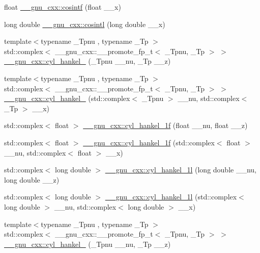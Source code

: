 \begin{DoxyCompactItemize}
\item 
float \hyperlink{group__gnu__math__spec__func_ga87202351dc97d2c69e42bf58f911fb5a}{\+\_\+\+\_\+gnu\+\_\+cxx\+::cosintf} (float \+\_\+\+\_\+x)
\item 
long double \hyperlink{group__gnu__math__spec__func_ga5f01f17ae8859129860118b09d51791c}{\+\_\+\+\_\+gnu\+\_\+cxx\+::cosintl} (long double \+\_\+\+\_\+x)
\item 
{\footnotesize template$<$typename \+\_\+\+Tpnu , typename \+\_\+\+Tp $>$ }\\std\+::complex$<$ \+\_\+\+\_\+gnu\+\_\+cxx\+::\+\_\+\+\_\+promote\+\_\+fp\+\_\+t$<$ \+\_\+\+Tpnu, \+\_\+\+Tp $>$ $>$ \hyperlink{group__gnu__math__spec__func_gafa5ad1cfd4cc30caaeb06bdab71e600b}{\+\_\+\+\_\+gnu\+\_\+cxx\+::cyl\+\_\+hankel\+\_} (\+\_\+\+Tpnu \+\_\+\+\_\+nu, \+\_\+\+Tp \+\_\+\+\_\+z)
\item 
{\footnotesize template$<$typename \+\_\+\+Tpnu , typename \+\_\+\+Tp $>$ }\\std\+::complex$<$ \+\_\+\+\_\+gnu\+\_\+cxx\+::\+\_\+\+\_\+promote\+\_\+fp\+\_\+t$<$ \+\_\+\+Tpnu, \+\_\+\+Tp $>$ $>$ \hyperlink{group__gnu__math__spec__func_ga0f0b05c483ed1d713ef9a96e844c1979}{\+\_\+\+\_\+gnu\+\_\+cxx\+::cyl\+\_\+hankel\+\_} (std\+::complex$<$ \+\_\+\+Tpnu $>$ \+\_\+\+\_\+nu, std\+::complex$<$ \+\_\+\+Tp $>$ \+\_\+\+\_\+x)
\item 
std\+::complex$<$ float $>$ \hyperlink{group__gnu__math__spec__func_ga89758ed03e56567baa62b90cc4784f71}{\+\_\+\+\_\+gnu\+\_\+cxx\+::cyl\+\_\+hankel\+\_\+1f} (float \+\_\+\+\_\+nu, float \+\_\+\+\_\+z)
\item 
std\+::complex$<$ float $>$ \hyperlink{group__gnu__math__spec__func_ga810e021a3f11c1b2253c15c6f4d41143}{\+\_\+\+\_\+gnu\+\_\+cxx\+::cyl\+\_\+hankel\+\_\+1f} (std\+::complex$<$ float $>$ \+\_\+\+\_\+nu, std\+::complex$<$ float $>$ \+\_\+\+\_\+x)
\item 
std\+::complex$<$ long double $>$ \hyperlink{group__gnu__math__spec__func_gacb49c66b4267fbc56906db02f14365f2}{\+\_\+\+\_\+gnu\+\_\+cxx\+::cyl\+\_\+hankel\+\_\+1l} (long double \+\_\+\+\_\+nu, long double \+\_\+\+\_\+z)
\item 
std\+::complex$<$ long double $>$ \hyperlink{group__gnu__math__spec__func_ga6900f79ec70673bcb001538aec74e07c}{\+\_\+\+\_\+gnu\+\_\+cxx\+::cyl\+\_\+hankel\+\_\+1l} (std\+::complex$<$ long double $>$ \+\_\+\+\_\+nu, std\+::complex$<$ long double $>$ \+\_\+\+\_\+x)
\item 
{\footnotesize template$<$typename \+\_\+\+Tpnu , typename \+\_\+\+Tp $>$ }\\std\+::complex$<$ \+\_\+\+\_\+gnu\+\_\+cxx\+::\+\_\+\+\_\+promote\+\_\+fp\+\_\+t$<$ \+\_\+\+Tpnu, \+\_\+\+Tp $>$ $>$ \hyperlink{group__gnu__math__spec__func_ga6c1d2d390e547ded9e0f4cc46395d90c}{\+\_\+\+\_\+gnu\+\_\+cxx\+::cyl\+\_\+hankel\+\_} (\+\_\+\+Tpnu \+\_\+\+\_\+nu, \+\_\+\+Tp \+\_\+\+\_\+z)

\end{DoxyCompactItemize}
